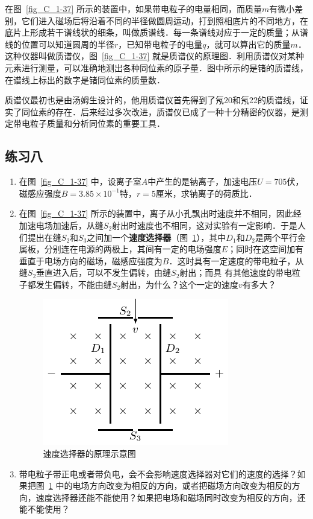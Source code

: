在图~\ref{fig_C_1-37} 所示的装置中，如果带电粒子的电量相同，而质量$m$有微小差别，它们进入磁场后将沿着不同的半径做圆周运动，打到照相底片的不同地方，在底片上形成若干谱线状的细条，叫做质谱线．每一条谱线对应于一定的质量；从谱线的位置可以知道圆周的半径$r$，已知带电粒子的电量$q$，就可以算出它的质量$m$．这种仪器叫做质谱仪，图~\ref{fig_C_1-37} 就是质谱仪的原理图．利用质谱仪对某种元素进行测量，可以准确地测出各种同位素的原子量．图中所示的是锗的质谱线，在谱线上标出的数字是锗同位素的质量数．

质谱仪最初也是由汤姆生设计的，他用质谱仪首先得到了氖20和氖22的质谱线，证实了同位素的存在．后来经过多次改进，质谱仪已成了一种十分精密的仪器，是测定带电粒子质量和分析同位素的重要工具．


\subsection*{练习八}
\begin{enumerate}
    \item 在图~\ref{fig_C_1-37} 中，设离子室$A$中产生的是钠离子，加速电压$U=705$伏，磁感应强度$B=3. 85\times10^{-1}$特，$r=5$厘米，求钠离子的荷质比．
    \item 在图~\ref{fig_C_1-37} 所示的装置中，离子从小孔飘出时速度并不相同，因此经加速电场加速后，从缝$S_2$射出时速度也不相同，这对实验有一定影响．于是人们提出在缝$S_2$和$S_3$之间加一个\textbf{速度选择器}（图~\ref{fig_C_1-38}），其中$D_1$和$D_2$是两个平行金属板，分别连在电源的两极上，其间有一定的电场强度$E$；同时在这空间加有垂直于电场方向的磁场，磁感应强度为$B$．这时具有一定速度的带电粒子，从缝$S_2$垂直进入后，可以不发生偏转，由缝$S_2$射出；而具
有其他速度的带电粒子都发生偏转，不能由缝$S_2$射出，为什么？这个一定的速度$v$有多大？
\begin{figure}[htbp]
    \centering
    \includegraphics{fig/C/1-38.pdf}
    \caption{速度选择器的原理示意图}\label{fig_C_1-38}
\end{figure}
\item 带电粒子带正电或者带负电，会不会影响速度选择器对它们的速度的选择？如果把图~\ref{fig_C_1-38} 中的电场方向改变为相反的方向，或者把磁场方向改变为相反的方向，速度选择器还能不能使用？如果把电场和磁场同时改变为相反的方向，还能不能使用？
\end{enumerate}

